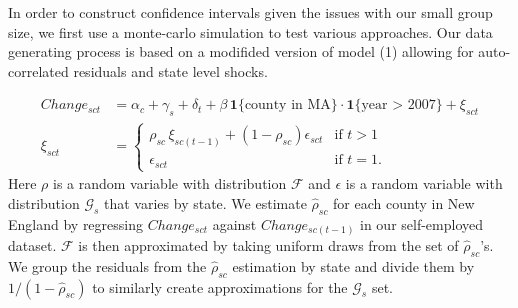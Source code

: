 \documentclass[12pt]{article}
\begin{document}
In order to construct confidence intervals given the issues with our small group size, we first use a monte-carlo simulation to test various approaches. Our data generating process is based on a modifided version of model (1) allowing for auto-correlated residuals and state level shocks. 
\begin{comment}
\begin{align}
Change_{sct} & = \alpha_c + \gamma_s + \delta_t + \beta \, \mathbf{1}\{\text{county in MA}\} \cdot \mathbf{1}\{\text{year > 2007}\} + \xi_{sct} \\
\xi_{sct} & = 
\begin{cases}\rho_{sc} \, \xi_{sc(t-1)} + (1-\rho_{sc}) \epsilon_{sct} &\mbox{if } t > 1 \nonumber \\ 
\epsilon_{sct}  & \mbox{if } t = 1. \end{cases}\\
\epsilon_{sct} & = \mu_{st} + \upsilon_{sct}
\end{align}
Here $\rho$ is a random variable with distribution $\mathcal{F}$, $\mu$ is a random variable with distribution $\mathcal{G}$ and $\upsilon$ is a random variable with distribution $\mathcal{H}$. We estimate $\hat{\rho}_{sc}$ for each county in New England by regressing $Change_{sct}$ against $Change_{sc(t-1)}$ in our self-employed dataset. $\mathcal{F}$ is then approximated by taking uniform draws from the set of $\hat{\rho}_{sc}$'s. We group the residuals from the $\hat{\rho}_{sc}$ estimation by state and divide them by $1/(1-\hat{\rho}_{sc})$ to generate a set of $\hat{\epsilon}_{sct}$ values. We use the mean of $\hat{\epsilon}_{sct}$ values grouped by state and year to produce a set of $\hat{\mu}_{st}$ values that once standardized appropriate $\mathcal{G}$. Then $\hat{\epsilon}_{sct}$ minus the corresponding $\hat{\mu}_{st}$ values produce a set of $\hat{\upsilon}_{sct}$ draws that once standardized approximate $\mathcal{H}$.
\end{comment}
\begin{align}
\label{eq:mc_dist}
Change_{sct} & = \alpha_c + \gamma_s + \delta_t + \beta \, \mathbf{1}\{\text{county in MA}\} \cdot \mathbf{1}\{\text{year > 2007}\} + \xi_{sct} \\
\xi_{sct} & = 
\begin{cases}\rho_{sc} \, \xi_{sc(t-1)} + (1-\rho_{sc}) \epsilon_{sct} &\mbox{if } t > 1 \nonumber \\ 
\epsilon_{sct}  & \mbox{if } t = 1. \end{cases}
\end{align}
Here $\rho$ is a random variable with distribution $\mathcal{F}$ and $\epsilon$ is a random variable with distribution $\mathcal{G}_s$ that varies by state. We estimate $\hat{\rho}_{sc}$ for each county in New England by regressing $Change_{sct}$ against $Change_{sc(t-1)}$ in our self-employed dataset. $\mathcal{F}$ is then approximated by taking uniform draws from the set of $\hat{\rho}_{sc}$'s. We group the residuals from the $\hat{\rho}_{sc}$ estimation by state and divide them by $1/(1-\hat{\rho}_{sc})$ to similarly create approximations for the $\mathcal{G}_s$ set. 
\end{document}
